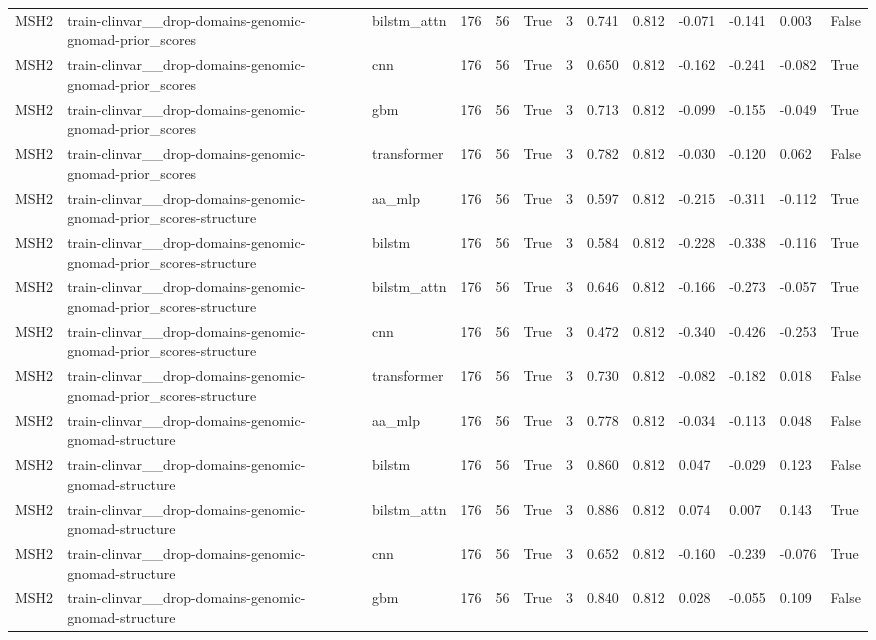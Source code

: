 \begin{table}[t]
\begin{tabular}{lllllllllllll}
MSH2 & train-clinvar\_\_drop-domains-genomic-gnomad-prior\_scores & bilstm\_attn & 176 & 56 & True & 3 & 0.741 & 0.812 & -0.071 & -0.141 & 0.003 & False \\
MSH2 & train-clinvar\_\_drop-domains-genomic-gnomad-prior\_scores & cnn & 176 & 56 & True & 3 & 0.650 & 0.812 & -0.162 & -0.241 & -0.082 & True \\
MSH2 & train-clinvar\_\_drop-domains-genomic-gnomad-prior\_scores & gbm & 176 & 56 & True & 3 & 0.713 & 0.812 & -0.099 & -0.155 & -0.049 & True \\
MSH2 & train-clinvar\_\_drop-domains-genomic-gnomad-prior\_scores & transformer & 176 & 56 & True & 3 & 0.782 & 0.812 & -0.030 & -0.120 & 0.062 & False \\
MSH2 & train-clinvar\_\_drop-domains-genomic-gnomad-prior\_scores-structure & aa\_mlp & 176 & 56 & True & 3 & 0.597 & 0.812 & -0.215 & -0.311 & -0.112 & True \\
MSH2 & train-clinvar\_\_drop-domains-genomic-gnomad-prior\_scores-structure & bilstm & 176 & 56 & True & 3 & 0.584 & 0.812 & -0.228 & -0.338 & -0.116 & True \\
MSH2 & train-clinvar\_\_drop-domains-genomic-gnomad-prior\_scores-structure & bilstm\_attn & 176 & 56 & True & 3 & 0.646 & 0.812 & -0.166 & -0.273 & -0.057 & True \\
MSH2 & train-clinvar\_\_drop-domains-genomic-gnomad-prior\_scores-structure & cnn & 176 & 56 & True & 3 & 0.472 & 0.812 & -0.340 & -0.426 & -0.253 & True \\
MSH2 & train-clinvar\_\_drop-domains-genomic-gnomad-prior\_scores-structure & transformer & 176 & 56 & True & 3 & 0.730 & 0.812 & -0.082 & -0.182 & 0.018 & False \\
MSH2 & train-clinvar\_\_drop-domains-genomic-gnomad-structure & aa\_mlp & 176 & 56 & True & 3 & 0.778 & 0.812 & -0.034 & -0.113 & 0.048 & False \\
MSH2 & train-clinvar\_\_drop-domains-genomic-gnomad-structure & bilstm & 176 & 56 & True & 3 & 0.860 & 0.812 & 0.047 & -0.029 & 0.123 & False \\
MSH2 & train-clinvar\_\_drop-domains-genomic-gnomad-structure & bilstm\_attn & 176 & 56 & True & 3 & 0.886 & 0.812 & 0.074 & 0.007 & 0.143 & True \\
MSH2 & train-clinvar\_\_drop-domains-genomic-gnomad-structure & cnn & 176 & 56 & True & 3 & 0.652 & 0.812 & -0.160 & -0.239 & -0.076 & True \\
MSH2 & train-clinvar\_\_drop-domains-genomic-gnomad-structure & gbm & 176 & 56 & True & 3 & 0.840 & 0.812 & 0.028 & -0.055 & 0.109 & False \\

\end{tabular}
\end{table}
